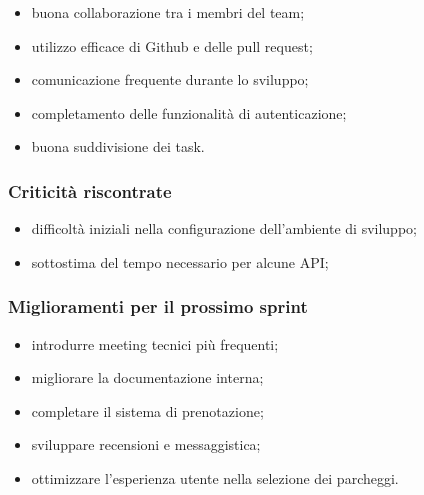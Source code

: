 \documentclass[12pt,a4paper]{article}
\begin{document}
\begin{itemize}
    \item buona collaborazione tra i membri del team;
    \item utilizzo efficace di Github e delle pull request;
    \item comunicazione frequente durante lo sviluppo;
    \item completamento delle funzionalità di autenticazione;
    \item buona suddivisione dei task.
\end{itemize}

\subsubsection{Criticità riscontrate}

\begin{itemize}
    \item difficoltà iniziali nella configurazione dell'ambiente di sviluppo;
    \item sottostima del tempo necessario per alcune API;
\end{itemize}

\subsubsection{Miglioramenti per il prossimo sprint}

\begin{itemize}
    \item introdurre meeting tecnici più frequenti;
    \item migliorare la documentazione interna;
    \item completare il sistema di prenotazione;
    \item sviluppare recensioni e messaggistica;
    \item ottimizzare l'esperienza utente nella selezione dei parcheggi.
\end{itemize}
\end{document}
